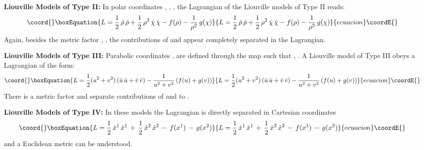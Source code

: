 \documentclass[a4paper,11pt,twoside]{article}
\def\r{\mathbb R}                   %
\begin{document}
\noindent \myHighlight{$\bullet$}\coordHE{} {\bf Liouville Models of Type II:} In polar coordinates \coordHE{}, \coordHE{}, \myHighlight{$\rho \in [0,\infty)$}\coordHE{}, \myHighlight{$\chi\in [0,2\pi)$}\coordHE{}
the Lagrangian of the Liouville models of Type II reads:
\begin{equation}\coord{}\boxEquation{
L = \displaystyle\frac{1}{2} \, \dot{\rho} \, \dot{\rho} +
\displaystyle\frac{1}{2} \,\rho^2 \,\dot{\chi} \, \dot{\chi}
-f(\rho)-\frac{1}{\rho^2} \, g(\chi)
\label{eq:liou2}
}{
L = \displaystyle\frac{1}{2} \, \dot{\rho} \, \dot{\rho} +
\displaystyle\frac{1}{2} \,\rho^2 \,\dot{\chi} \, \dot{\chi}
-f(\rho)-\frac{1}{\rho^2} \, g(\chi)
}{ecuacion}\coordE{}\end{equation}
Again, besides the metric factor  \coordHE{}, \coordHE{},
the contributions of \myHighlight{$\rho$}\coordHE{} and \myHighlight{$\chi$}\coordHE{} appear completely separated
in the Lagrangian.

\vspace*{0.1cm}

\noindent \myHighlight{$\bullet$}\coordHE{} {\bf Liouville Models of Type III:} Parabolic
coordinates \coordHE{}, \myHighlight{$v\in [0,\infty)$}\coordHE{} are defined
through the map \myHighlight{$\gamma^{*}: D\longrightarrow {\r}^2$}\coordHE{} such that
\coordHE{}, \coordHE{}. A
Liouville model of Type III obeys a Lagrangian of the form:
\begin{equation}\coord{}\boxEquation{
L = \displaystyle\frac{1}{2} (u^2+v^2) \left( \dot{u} \, \dot{u} +\dot{v} \, \dot{v} \right)
-\displaystyle\frac{1}{u^2+v^2} \left( f(u)+g(v) \right)
\label{eq:liou3}
}{
L = \displaystyle\frac{1}{2} (u^2+v^2) \left( \dot{u} \, \dot{u} +\dot{v} \, \dot{v} \right)
-\displaystyle\frac{1}{u^2+v^2} \left( f(u)+g(v) \right)
}{ecuacion}\coordE{}\end{equation}
There is a metric factor \coordHE{} and
separate contributions of \coordHE{} and \coordHE{} to \coordHE{}.

\vspace*{0.1cm}

\noindent \myHighlight{$\bullet$}\coordHE{} {\bf Liouville Models of Type IV:} In these models the
Lagrangian is directly separated in Cartesian coordinates
\begin{equation}\coord{}\boxEquation{
L = \displaystyle\frac{1}{2} \,\dot{x}^1 \, \dot{x}^1 \,+\, \displaystyle\frac{1}{2} \, \dot{x}^2 \, \dot{x}^2\, -\,f(x^1)\,-\,g(x^2)
\label{eq:liou4}
}{
L = \displaystyle\frac{1}{2} \,\dot{x}^1 \, \dot{x}^1 \,+\, \displaystyle\frac{1}{2} \, \dot{x}^2 \, \dot{x}^2\, -\,f(x^1)\,-\,g(x^2)
}{ecuacion}\coordE{}\end{equation}
and a  Euclidean metric \coordHE{} can be understood.
\end{document}
